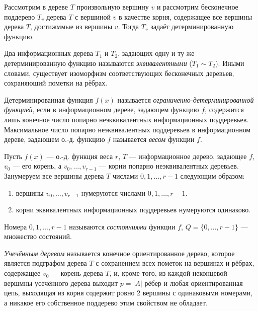 Рассмотрим в дереве $T$ произвольную вершину $v$ и рассмотрим бесконечное поддерево $T_v$ дерева $T$ с вершиной $v$ в качестве корня, содержащее все вершины дерева $T$, достижммые из вершины $v$. Тогда $T_v$ задаёт детерминированную функцию.

\begin{definition}
    Два информационных дерева $T_1$ и $T_2$, задающих одну и ту же детерминированную функцию называются \textit{эквивалентными} ($T_1 \sim T_2$). Иными словами, существует изоморфизм соответствующих бесконечных деревьев, сохраняющий пометки на рёбрах.
\end{definition}

\begin{definition}
    Детерминированная функция $f(x)$ называется \textit{ограниченно-детерминированной функцией}, если в информационном дереве, задающем функцию $f$, содержится лишь конечное число попарно неэквивалентных информационных поддеревьев. Максимальное число попарно неэквивалентных поддеревьев в информационном дереве, задающем о.-д. функцию $f$ называется \textit{весом} функции $f$.
\end{definition}

Пусть $f(x)$ --- о.-д. функция веса $r$, $T$ --- информационное дерево, задающее $f$, $v_0$ --- его корень, а $v_0, \ldots, v_{r-1}$ --- корни попарно неэквивалентных деревьев. Занумеруем все вершины дерева $T$ числами $0, 1, \ldots, r-1$ следующим образом:
\begin{enumerate}[nolistsep]
    \item вершины $v_0, \ldots, v_{r-1}$ нумеруются числами $0, 1, \ldots, r-1$.
    \item корни эквивалентных информационных поддеревьев нумеруются одинаково.
\end{enumerate}

\begin{definition}
    Номера $0, 1, \ldots, r-1$ называются \textit{состояниями} функции $f$, $Q=\{0, \ldots, r-1\}$ --- множество состояний.
\end{definition}

\begin{definition}
    \textit{Учечённым деревом} называется конечное ориентированное дерево, которое является подграфом дерева $T$ с сохранением всех пометок на вершинах и рёбрах, содержащее $v_0$ --- корень дерева $T$, и, кроме того, из каждой неконцевой вершмны усечённого дерева выходит $p=|A|$ рёбер и любая ориентированная цепь, выходящая из корня содержит ровно 2 вершины с одинаковыми номерами, а никакое его собственное поддерево этим свойством не обладает.
\end{definition}

